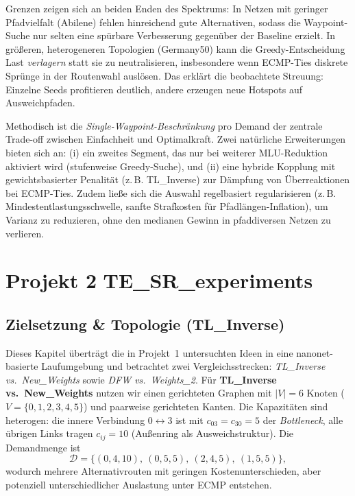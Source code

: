 \documentclass[sigconf,nonacm,review]{acmart}
\begin{document}
Grenzen zeigen sich an beiden Enden des Spektrums: In Netzen mit geringer Pfadvielfalt (Abilene) fehlen
hinreichend gute Alternativen, sodass die Waypoint-Suche nur selten eine spürbare Verbesserung gegenüber
der Baseline erzielt. In größeren, heterogeneren Topologien (Germany50) kann die Greedy-Entscheidung
Last \emph{verlagern} statt sie zu neutralisieren, insbesondere wenn ECMP-Ties diskrete Sprünge in der
Routenwahl auslösen. Das erklärt die beobachtete Streuung: Einzelne Seeds profitieren deutlich, andere
erzeugen neue Hotspots auf Ausweichpfaden.

Methodisch ist die \emph{Single-Waypoint-Beschränkung} pro Demand der zentrale Trade-off zwischen
Einfachheit und Optimalkraft. Zwei natürliche Erweiterungen bieten sich an: (i) ein zweites Segment, das
nur bei weiterer MLU-Reduktion aktiviert wird (stufenweise Greedy-Suche), und (ii) eine hybride Kopplung
mit gewichtsbasierter Penalität (z.\,B. TL\_Inverse) zur Dämpfung von Überreaktionen bei ECMP-Ties.
Zudem ließe sich die Auswahl regelbasiert regularisieren (z.\,B. Mindestentlastungsschwelle, sanfte
Strafkosten für Pfadlängen-Inflation), um Varianz zu reduzieren, ohne den medianen Gewinn in
pfaddiversen Netzen zu verlieren.


\FloatBarrier
\section{Projekt 2\,\textemdash\,TE\_SR\_experiments}

\subsection{Zielsetzung \& Topologie (TL\_Inverse)}
Dieses Kapitel überträgt die in Projekt~1 untersuchten Ideen in eine nanonet-basierte Laufumgebung und betrachtet zwei Vergleichs­strecken: \emph{TL\_Inverse vs.\ New\_Weights} sowie \emph{DFW vs.\ Weights\_2}.
Für \textbf{TL\_Inverse vs.\ New\_Weights} nutzen wir einen gerichteten Graphen mit $|V|=6$ Knoten ($V=\{0,1,2,3,4,5\}$) und paarweise gerichteten Kanten. Die Kapazitäten sind heterogen: die innere Verbindung $0\leftrightarrow3$ ist mit $c_{03}=c_{30}=5$ der \emph{Bottleneck}, alle übrigen Links tragen $c_{ij}=10$ (Außenring als Ausweichstruktur). Die Demandmenge ist
\[
\mathcal{D}=\{(0,4,10),\ (0,5,5),\ (2,4,5),\ (1,5,5)\},
\]
wodurch mehrere Alternativrouten mit geringen Kostenunterschieden, aber potenziell unterschiedlicher Auslastung unter ECMP entstehen.
\end{document}
